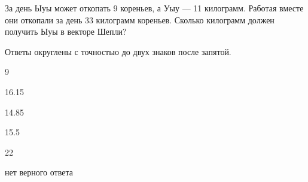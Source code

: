 
\begin{question}
За день Ыуы может откопать 9 кореньев, а Уыу --- 11 килограмм. Работая
вместе они откопали за день 33 килограмм кореньев. Сколько килограмм
должен получить Ыуы в векторе Шепли?

Ответы округлены с точностью до двух знаков после запятой.
\begin{answerlist}
  \item 9
  \item 16.15
  \item 14.85
  \item 15.5
  \item 22
  \item нет верного ответа
\end{answerlist}
\end{question}


